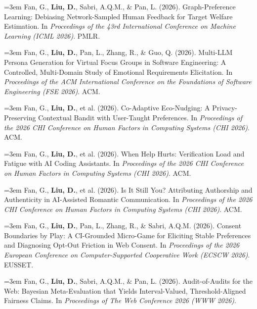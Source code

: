 \documentclass[a4paper,11pt]{article}
\newcommand{\publication}[2]{%
  \par\addvspace{8pt}\noindent
  \begin{minipage}{\linewidth}
    \fontsize{10.8}{13.4}\selectfont\raggedright
    \hangindent=3em\hangafter=1
    \makebox[3em][l]{\textcolor{teal}{[#1]}}#2
  \end{minipage}\par}
\begin{document}
\publication{R3}{Fan, G., \textbf{Liu, D.}, Sabri, A.Q.M., \& Pan, L. (2026). Graph-Preference Learning: Debiasing Network-Sampled Human Feedback for Target Welfare Estimation. In \emph{Proceedings of the 43rd International Conference on Machine Learning (ICML 2026)}. PMLR.}

\publication{R4}{Fan, G., \textbf{Liu, D.}, Pan, L., Zhang, R., \& Guo, Q. (2026). Multi-LLM Persona Generation for Virtual Focus Groups in Software Engineering: A Controlled, Multi-Domain Study of Emotional Requirements Elicitation. In \emph{Proceedings of the ACM International Conference on the Foundations of Software Engineering (FSE 2026)}. ACM.}

\publication{R5}{Fan, G., \textbf{Liu, D.}, et al. (2026). Co-Adaptive Eco-Nudging: A Privacy-Preserving Contextual Bandit with User-Taught Preferences. In \emph{Proceedings of the 2026 CHI Conference on Human Factors in Computing Systems (CHI 2026)}. ACM.}

\publication{R6}{Fan, G., \textbf{Liu, D.}, et al. (2026). When Help Hurts: Verification Load and Fatigue with AI Coding Assistants. In \emph{Proceedings of the 2026 CHI Conference on Human Factors in Computing Systems (CHI 2026)}. ACM.}

\publication{R7}{Fan, G., \textbf{Liu, D.}, et al. (2026). Is It Still You? Attributing Authorship and Authenticity in AI-Assisted Romantic Communication. In \emph{Proceedings of the 2026 CHI Conference on Human Factors in Computing Systems (CHI 2026)}. ACM.}

\publication{R8}{Fan, G., \textbf{Liu, D.}, Pan, L., Zhang, R., \& Sabri, A.Q.M. (2026). Consent Boundaries by Play: A CI-Grounded Micro-Game for Eliciting Stable Preferences and Diagnosing Opt-Out Friction in Web Consent. In \emph{Proceedings of the 2026 European Conference on Computer-Supported Cooperative Work (ECSCW 2026)}. EUSSET.}

\publication{R9}{Fan, G., \textbf{Liu, D.}, Sabri, A.Q.M., \& Pan, L. (2026). Audit-of-Audits for the Web: Bayesian Meta-Evaluation that Yields Interval-Valued, Threshold-Aligned Fairness Claims. In \emph{Proceedings of The Web Conference 2026 (WWW 2026)}.}
\end{document}
